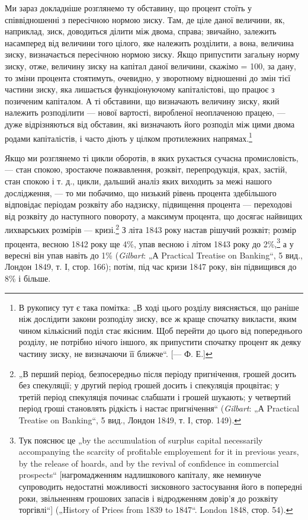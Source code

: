 
Ми зараз докладніше розглянемо ту обставину, що процент
стоїть у співвідношенні з пересічною нормою зиску. Там, де
ціле даної величини, як, наприклад, зиск, доводиться ділити між
двома, справа; звичайно, залежить насамперед від величини того
цілого, яке належить розділити, а вона, величина зиску, визначається
пересічною нормою зиску. Якщо припустити загальну
норму зиску, отже, величину зиску на капітал даної величини,
скажімо = 100, за дану, то зміни процента стоятимуть, очевидно,
у зворотному відношенні до змін тієї частини зиску, яка лишається
функціонуючому капіталістові, що працює з позиченим
капіталом. А ті обставини, що визначають величину зиску, який
належить розподілити — нової вартості, виробленої неоплаченою
працею, — дуже відрізняються від обставин, які визначають його
розподіл між цими двома родами капіталістів, і часто діють у цілком
протилежних напрямах.\footnote{
В рукопису тут є така помітка: „В ході цього розділу виясняється, що
раніше ніж дослідити закони розподілу зиску, все ж краще спочатку викласти,
яким чином кількісний поділ стає якісним. Щоб перейти до цього від попереднього
розділу, не потрібно нічого іншого, як припустити спочатку процент як
деяку частину зиску, не визначаючи її ближче“. [— Ф. Е.]
}

Якщо ми розглянемо ті цикли оборотів, в яких рухається сучасна
промисловість, — стан спокою, зростаюче пожвавлення, розквіт,
перепродукція, крах, застій, стан спокою і т. д., цикли,
дальший аналіз яких виходить за межі нашого дослідження, —
то ми побачимо, що низький рівень процента здебільшого відповідає
періодам розквіту або надзиску, підвищення процента —
переходові від розквіту до наступного повороту, а максимум
процента, що досягає найвищих лихварських розмірів — кризі.\footnote{
„В перший період, безпосередньо після періоду пригнічення, грошей
досить без спекуляції; у другий період грошей досить і спекуляція процвітає;
у третій період спекуляція починає слабшати і грошей шукають; у четвертий
період гроші становлять рідкість і настає пригнічення“ (\emph{Gilbart}: „А Practical
Treatise on Banking“, 5 вид., Лондон 1849, т. І, стор. 149).
}
З літа 1843 року настав рішучий розквіт; розмір процента, весною
1842 року ще 4\%, упав весною і літом 1843 року до 2\%,\footnote{
Тук пояснює це „by the accumulation of surplus capital necessarily accompanying
the scarcity of profitable employement for it in previous years, by the release
of hoards, and by the revival of confidence in commercial prospects“ [нагромадженням
надлишкового капіталу, яке неминуче супроводить недостатні
можливості зисковного застосування його в попередні роки, звільненням грошових
запасів і відродженням довір’я до розквіту торгівлі“] („History of
Prices from 1839 to 1847“. London 1848, стор. 54).
}
а у вересні він упав навіть до 1\% (\emph{Gilbart}: „А Practical Treatise
on Banking“, 5 вид., Лондон 1849, т. І, стор. 166); потім, під час
кризи 1847 року, він підвищився до 8\% і більше.

